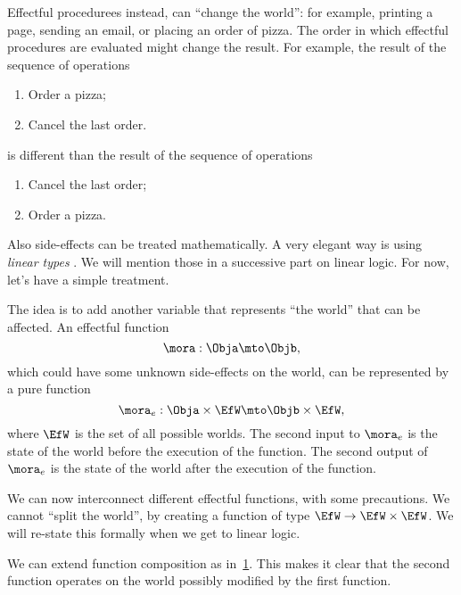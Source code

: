 Effectful procedurees instead, can ``change the world'': for example, printing a page, sending an email, or placing an order of pizza.
The order in which effectful procedures are evaluated might change the result.
For example, the result of the sequence of operations
% 
\begin{enumerate}
    \item Order a pizza;
    \item Cancel the last order.
\end{enumerate}
% 
is different than the result of the sequence of operations
% 
\begin{enumerate}
    \item Cancel the last order;
    \item Order a pizza.
\end{enumerate}

Also side-effects can be treated mathematically.
A very elegant way is using \emph{linear types} \XXX.
We will mention those in a successive part on linear logic.
For now, let's have a simple treatment.

The idea is to add another variable that represents ``the world'' that can be affected.
An effectful function
% 
\begin{equation}
    \mora: \Obja \mto \Objb,
\end{equation}
% 
which could have some unknown side-effects on the world, can be represented by a pure function
% 
\begin{equation}
    \mora_e:  \Obja \times \EfW \mto   \Objb \times \EfW,
\end{equation}
% 
where $\EfW$ is the set of all possible worlds.
The second input to $\mora_e$ is the state of the world before the execution of the function.
The second output of $\mora_e$ is the state of the world after the execution of the function.

We can now interconnect different effectful functions, with some precautions.
We cannot ``split the world'', by creating a function of type $\EfW \to \EfW \times \EfW$.
We will re-state this formally when we get to linear logic.

We can extend function composition as in~\cref{fig:effect-composition}.
This makes it clear that the second function operates on the world possibly modified by the first function.

\begin{figure}[h]
    \caption{}
    \label{fig:effect-composition}
\end{figure}

